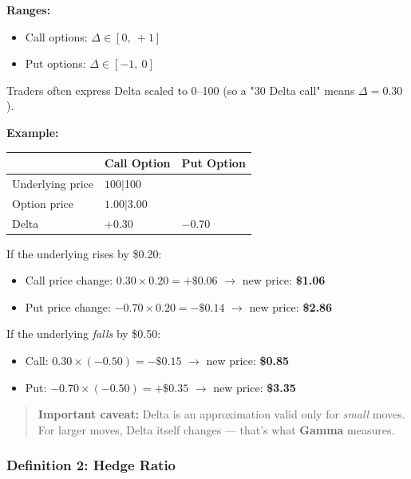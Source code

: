 \documentclass[12pt,openany]{book}
\begin{document}
\textbf{Ranges:}
\begin{itemize}[leftmargin=*]
    \item Call options: \(\Delta \in [0,\ +1]\)
    \item Put options: \(\Delta \in [-1,\ 0]\)
\end{itemize}

Traders often express Delta scaled to 0–100 (so a "30 Delta call" means \(\Delta = 0.30\)).

\textbf{Example:}

\begin{center}
\scriptsize
\setlength{\tabcolsep}{3pt}
\begin{tabular}{|L{4.1cm}|L{4.1cm}|L{4.1cm}|}
\hline
\textbf{} & \textbf{Call Option} & \textbf{Put Option} \\
\hline
Underlying price & \(100 | \)100 &  \\
\hline
Option price & \(1.00 | \)3.00 &  \\
\hline
Delta & +0.30 & −0.70 \\
\hline
\end{tabular}
\end{center}

If the underlying rises by \$0.20:
\begin{itemize}[leftmargin=*]
    \item Call price change: \(0.30 \times 0.20 = +\$0.06\) \(\rightarrow\) new price: \textbf{\$1.06}
    \item Put price change: \(-0.70 \times 0.20 = -\$0.14\) \(\rightarrow\) new price: \textbf{\$2.86}
\end{itemize}

If the underlying \emph{falls} by \$0.50:
\begin{itemize}[leftmargin=*]
    \item Call: \(0.30 \times (-0.50) = -\$0.15\) \(\rightarrow\) new price: \textbf{\$0.85}
    \item Put: \(-0.70 \times (-0.50) = +\$0.35\) \(\rightarrow\) new price: \textbf{\$3.35}
\end{itemize}

\begin{quote}
\textbf{Important caveat:} Delta is an approximation valid only for \emph{small} moves. For larger moves, Delta itself changes — that's what \textbf{Gamma} measures.
\end{quote}

\subsubsection{Definition 2: Hedge Ratio}
\end{document}
